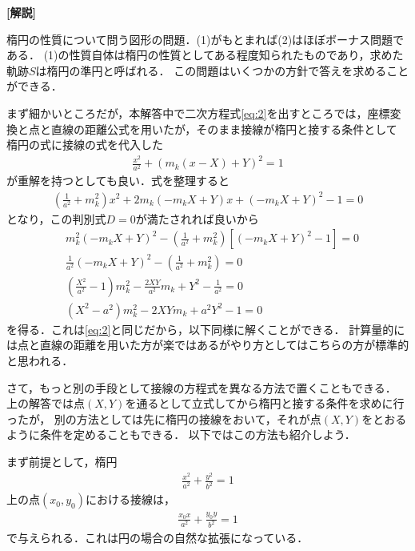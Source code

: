 \documentclass[a4paper,10pt]{ltjsarticle}
\begin{document}
\begin{multicols}{2}
  \vspace{10pt}
  {\bf[解説]}

  楕円の性質について問う図形の問題．(1)がもとまれば(2)はほぼボーナス問題である．
  (1)の性質自体は楕円の性質としてある程度知られたものであり，求めた軌跡$S$は楕円の準円と呼ばれる．
  この問題はいくつかの方針で答えを求めることができる．

  まず細かいところだが，本解答中で二次方程式\cref{eq:2}を出すところでは，座標変換と点と直線の距離公式を用いたが，そのまま接線が楕円と接する条件として
  楕円の式に接線の式を代入した
  \begin{align*}
    \frac{x^2}{a^2}+\left(m_k(x-X)+Y\right)^2 = 1
  \end{align*}
  が重解を持つとしても良い．式を整理すると
  \begin{align*}
    \left(\frac{1}{a^2}+m_k^2\right)x^2 + 2m_k\left(-m_kX+Y\right)x +\left(-m_kX+Y\right)^2 -1 = 0
  \end{align*}
  となり，この判別式$D=0$が満たされれば良いから
  \begin{align*}
     & m_k^2\left(-m_kX+Y\right)^2 - \left(\frac{1}{a^2}+m_k^2\right)\left[\left(-m_kX+Y\right)^2 -1\right] = 0 \\
     & \frac{1}{a^2}\left(-m_kX+Y\right)^2 -\left(\frac{1}{a^2}+m_k^2\right) = 0                                \\
     & \left(\frac{X^2}{a^2}-1\right)m_k^2 - \frac{2XY}{a^2}m_k + Y^2 -\frac{1}{a^2} = 0                        \\
     & \left(X^2-a^2\right)m_k^2 - 2XYm_k + a^2Y^2 - 1= 0
  \end{align*}
  を得る．これは\cref{eq:2}と同じだから，以下同様に解くことができる．
  計算量的には点と直線の距離を用いた方が楽ではあるがやり方としてはこちらの方が標準的と思われる．

  さて，もっと別の手段として接線の方程式を異なる方法で置くこともできる．
  上の解答では点$(X,Y)$を通るとして立式してから楕円と接する条件を求めに行ったが，
  別の方法としては先に楕円の接線をおいて，それが点$(X,Y)$をとおるように条件を定めることもできる．
  以下ではこの方法も紹介しよう．

  まず前提として，楕円
  \begin{align*}
    \frac{x^2}{a^2}+\frac{y^2}{b^2} = 1
  \end{align*}
  上の点$(x_0,y_0)$における接線は，
  \begin{align*}
    \frac{x_0 x}{a^2}+\frac{y_0 y}{b^2} = 1
  \end{align*}
  で与えられる．これは円の場合の自然な拡張になっている．


\end{multicols}
\end{document}

